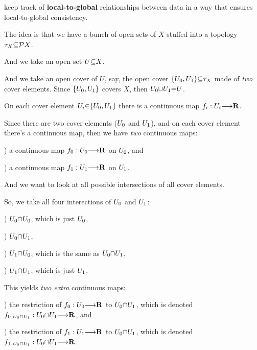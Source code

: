 \vs
{} keep track of {\bf local-to-global} relationships between data in a way that ensures local-to-global consistency. \par

\vs
The idea is that we have a bunch of open sets of $X$ stuffed into a topology $\tau_X \p\subseteq {\cal P}X$. \par
And we take an open set $U \p\subseteq X$. \par
And we take an open cover of $U$, say, the open cover $\a\{\g{U_0}, \b{U_1}\a\} \p\subseteq \tau_X$ made of {\it two} cover elements. Since $\a\{\g{U_0}, \b{U_1}\a\}$ covers $X$, then $\g{U_0} \p\cup\b{U_1} \p= U$. \par
On each cover element $U_i \p\in \a\{\g{U_0}, \b{U_1}\a\}$ there is a continuous map $f_i: U_i \to \R$. \par
Since there are two cover elements ($\g{U_0}$ and $\b{U_1}$), and on each cover element there's a continuous map, then we have {\it two} continuous maps: \par
  ) a continuous map $\g{f_0}: \g{U_0} \to \R$ on $\g{U_0}$, and \par
  ) a continuous map $\b{f_1}: \b{U_1} \to \R$ on $\b{U_1}$. \par
And we want to look at all possible intersections of all cover elements. \par
So, we take all four interections of $\g{U_0}$ and $\b{U_1}$: \par
  ) $\g{U_0} \p\cap \g{U_0}$, which is just $\g{U_0}$, \par
  ) $\g{U_0} \p\cap \b{U_1}$, \par
  ) $\b{U_1} \p\cap \g{U_0}$, which is the same as $\g{U_0} \p\cap \b{U_1}$, \par
  ) $\b{U_1} \p\cap \b{U_1}$, which is just $\b{U_1}$. \par
This yields {\it two extra} continuous maps: \par
  ) the restriction of $\g{f_0}: \g{U_0} \to \R$ to $\g{U_0} \p\cap \b{U_1}$, which is denoted $\g{f_0}|_{\g{U_0} \p\cap \b{U_1}}: \g{U_0} \p\cap \b{U_1} \to \R$, and \par
  ) the restriction of $\b{f_1}: \b{U_1} \to \R$ to $\g{U_0} \p\cap \b{U_1}$, which is denoted $\b{f_1}|_{\g{U_0} \p\cap \b{U_1}}: \g{U_0} \p\cap \b{U_1} \to \R$. \par
